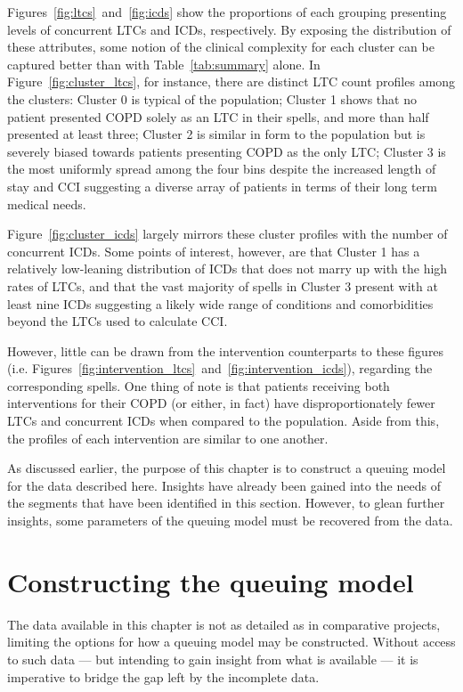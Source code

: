 Figures~\ref{fig:ltcs}~and~\ref{fig:icds} show the proportions of each grouping
presenting levels of concurrent LTCs and ICDs, respectively. By exposing the
distribution of these attributes, some notion of the clinical complexity for
each cluster can be captured better than with Table~\ref{tab:summary} alone. In
Figure~\ref{fig:cluster_ltcs}, for instance, there are distinct LTC count
profiles among the clusters: Cluster 0 is typical of the population; Cluster 1
shows that no patient presented COPD solely as an LTC in their spells, and more
than half presented at least three; Cluster 2 is similar in form to the
population but is severely biased towards patients presenting COPD as the only
LTC; Cluster 3 is the most uniformly spread among the four bins despite the
increased length of stay and CCI suggesting a diverse array of patients in
terms of their long term medical needs.

Figure~\ref{fig:cluster_icds} largely mirrors these cluster profiles with the
number of concurrent ICDs. Some points of interest, however, are that Cluster 1
has a relatively low-leaning distribution of ICDs that does not marry up with
the high rates of LTCs, and that the vast majority of spells in Cluster 3
present with at least nine ICDs suggesting a likely wide range of conditions and
comorbidities beyond the LTCs used to calculate CCI.\

However, little can be drawn from the intervention counterparts to these figures
(i.e. Figures~\ref{fig:intervention_ltcs}~and~\ref{fig:intervention_icds}),
regarding the corresponding spells. One thing of note is that patients receiving
both interventions for their COPD (or either, in fact) have disproportionately
fewer LTCs and concurrent ICDs when compared to the population. Aside from this,
the profiles of each intervention are similar to one another.

As discussed earlier, the purpose of this chapter is to construct a queuing model
for the data described here. Insights have already been gained into the needs of
the segments that have been identified in this section. However, to glean
further insights, some parameters of the queuing model must be recovered from
the data.

\section{Constructing the queuing model}\label{sec:model}

The data available in this chapter is not as detailed as in comparative
projects, limiting the options for how a queuing model may be constructed.
Without access to such data --- but intending to gain insight from what is
available --- it is imperative to bridge the gap left by the incomplete data.

